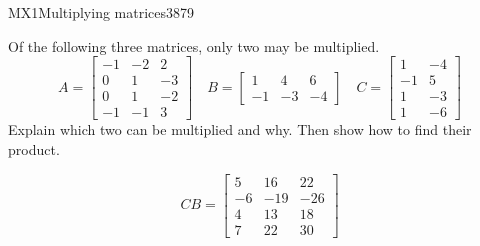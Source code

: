 \begin{exercise}{MX1}{Multiplying matrices}{3879} 
\begin{exerciseStatement} 

Of the following three matrices, only two may be multiplied. \[
          A=\left[\begin{array}{ccc}
-1 & -2 & 2 \\
0 & 1 & -3 \\
0 & 1 & -2 \\
-1 & -1 & 3
\end{array}\right] \hspace{1em} B=\left[\begin{array}{ccc}
1 & 4 & 6 \\
-1 & -3 & -4
\end{array}\right] \hspace{1em} C=\left[\begin{array}{cc}
1 & -4 \\
-1 & 5 \\
1 & -3 \\
1 & -6
\end{array}\right]
      \] Explain which two can be multiplied and why. Then show how to find their product.

 \end{exerciseStatement}
 \begin{exerciseAnswer} \[CB=\left[\begin{array}{ccc}
5 & 16 & 22 \\
-6 & -19 & -26 \\
4 & 13 & 18 \\
7 & 22 & 30
\end{array}\right]\] \end{exerciseAnswer}
 \end{exercise}


